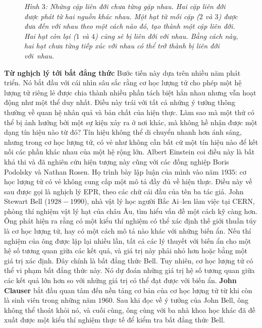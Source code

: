 \begin{multicols}{2}
\begin{figure}[H]
		\caption{\small\textit{\color{timhieukhoahoc}Hình $3$: Những cặp liên đới chưa từng gặp nhau. Hai cặp liên đới được phát từ hai nguồn khác nhau. Một hạt từ mỗi cặp ($2$ và $3$) được đưa đến với nhau theo một cách nào đó, tạo thành một cặp liên đới. Hai hạt còn lại ($1$ và $4$) cũng sẽ bị liên đới với nhau. Bằng cách này, hai hạt chưa từng tiếp xúc với nhau có thể trở thành bị liên đới với~nhau.}}
		\vspace*{-10pt}
	\end{figure}
	\textbf{\color{timhieukhoahoc}Từ nghịch lý tới bất đẳng thức}
	\vskip 0.1cm
	Bước tiến này dựa trên nhiều năm phát triển. Nó bắt đầu với cái nhìn sâu sắc rằng cơ học lượng tử cho phép một hệ lượng tử riêng lẻ được chia thành nhiều phần tách biệt hẳn nhau nhưng vẫn hoạt động như một thể duy nhất.
	\vskip 0.1cm
	Điều này trái với tất cả những ý tưởng thông thường về quan hệ nhân quả và bản chất của hiện thực. Làm sao mà một thứ có thể bị ảnh hưởng bởi một sự kiện xảy ra ở nơi khác, mà không hề nhận được một dạng tín hiệu nào từ đó? Tín hiệu không thể di chuyển nhanh hơn ánh sáng, nhưng trong cơ học lượng tử, có vẻ như không cần bất cứ một tín hiệu nào để kết nối các phần khác nhau của một hệ rộng lớn.
	\vskip 0.1cm
	Albert Einstein coi điều này là bất khả thi và đã nghiên cứu hiện tượng này cũng với các đồng nghiệp Boris Podolsky và Nathan Rosen. Họ trình bày lập luận của mình vào năm $1935$: cơ học lượng tử có vẻ không cung cấp một mô tả đầy đủ về hiện thực. Điều này về sau được gọi là nghịch lý EPR, theo các chữ cái đầu của tên ba tác giả.
	\vskip 0.1cm
	John Stewart Bell ($1928 - 1990$), nhà vật lý học người Bắc Ai--len làm việc tại CERN, phòng thí nghiệm vật lý hạt của châu Âu, tìm hiểu vấn đề một cách kỹ càng hơn. Ông phát hiện ra rằng có một kiểu thí nghiệm có thể xác định thế giới thuần túy là cơ học lượng tử, hay có một cách mô tả nào khác với những biến ẩn. Nếu thí nghiệm của ông được lặp lại nhiều lần, tất cả các lý thuyết với biến ẩn cho một hệ số tương quan giữa các kết quả, và giá trị này phải nhỏ hơn hoặc bằng một giá trị xác định. Đây chính là bất đẳng thức Bell.
	\vskip 0.1cm
	Tuy nhiên, cơ học lượng tử có thể vi phạm bất đẳng thức này. Nó dự đoán những giá trị hệ số tương quan giữa các kết quả lớn hơn so với những giá trị có thể đạt được với biến ẩn.
	\vskip 0.1cm
	\textbf{\color{timhieukhoahoc}John Clauser} bắt đầu quan tâm đến nền tảng cơ bản của cơ học lượng tử từ khi còn là sinh viên trong những năm $1960$. Sau khi đọc về ý tưởng của John Bell, ông không thể thoát khỏi nó, và cuối cùng, ông cùng với ba nhà khoa học khác đã đề xuất được một kiểu thí nghiệm thực tế để kiểm tra bất đẳng thức Bell.

\end{multicols}
